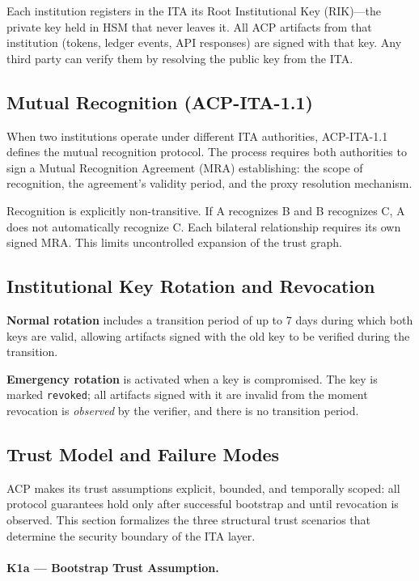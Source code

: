 \documentclass[11pt]{article}
\theoremstyle{definition}
\begin{document}
Each institution registers in the ITA its Root Institutional Key (RIK)---the private key held in HSM that never leaves it.
All ACP artifacts from that institution (tokens, ledger events, API responses) are signed with that key.
Any third party can verify them by resolving the public key from the ITA.

\subsection{Mutual Recognition (ACP-ITA-1.1)}

When two institutions operate under different ITA authorities,
ACP-ITA-1.1 defines the mutual recognition protocol.
The process requires both authorities to sign a Mutual Recognition Agreement (MRA) establishing:
the scope of recognition, the agreement's validity period,
and the proxy resolution mechanism.

Recognition is explicitly non-transitive.
If A recognizes B and B recognizes C, A does not automatically recognize C.
Each bilateral relationship requires its own signed MRA.
This limits uncontrolled expansion of the trust graph.

\subsection{Institutional Key Rotation and Revocation}

\textbf{Normal rotation} includes a transition period of up to 7 days during which both keys are valid,
allowing artifacts signed with the old key to be verified during the transition.

\textbf{Emergency rotation} is activated when a key is compromised.
The key is marked \texttt{revoked}; all artifacts signed with it are invalid
from the moment revocation is \emph{observed} by the verifier,
and there is no transition period.

\subsection{Trust Model and Failure Modes}
\label{sec:ita-trust-model}

ACP makes its trust assumptions explicit, bounded, and temporally scoped:
all protocol guarantees hold only after successful bootstrap and until revocation is observed.
This section formalizes the three structural trust scenarios that determine the security boundary
of the ITA layer.

\paragraph{K1a --- Bootstrap Trust Assumption.}
\end{document}
